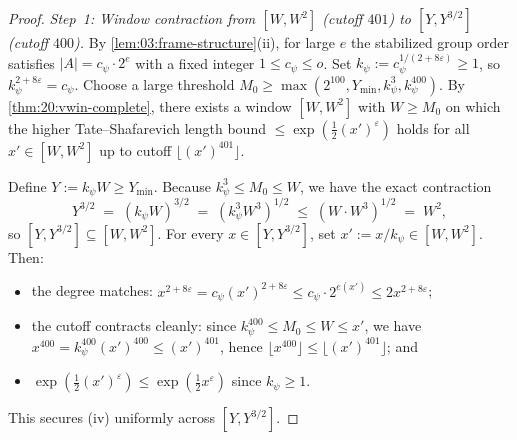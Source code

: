 \begin{proof}
\emph{Step~1: Window contraction from $[W, W^2]$ (cutoff $401$) to $[Y, Y^{3/2}]$ (cutoff $400$).}
By \cref{lem:03:frame-structure}(ii), for large $e$ the stabilized group order satisfies $|A| = c_\psi \cdot 2^e$ with a fixed integer $1 \le c_\psi \le o$. Set $k_\psi := c_\psi^{1/(2+8\varepsilon)} \ge 1$, so $k_\psi^{2+8\varepsilon} = c_\psi$. Choose a large threshold $M_0 \ge \max(2^{100}, Y_{\min}, k_\psi^3, k_\psi^{400})$. By \cref{thm:20:vwin-complete}, there exists a window $[W, W^2]$ with $W \ge M_0$ on which the higher Tate--Shafarevich length bound $\le \exp(\frac{1}{2} (x')^\varepsilon)$ holds for all $x' \in [W, W^2]$ up to cutoff $\lfloor (x')^{401}\rfloor$.

Define $Y := k_\psi W \ge Y_{\min}$. Because $k_\psi^3 \le M_0 \le W$, we have the exact contraction
\[
  Y^{3/2} \;=\; (k_\psi W)^{3/2} \;=\; (k_\psi^3 W^3)^{1/2} \;\le\; (W \cdot W^3)^{1/2} \;=\; W^2,
\]
so $[Y, Y^{3/2}] \subseteq [W, W^2]$. For every $x \in [Y, Y^{3/2}]$, set $x' := x / k_\psi \in [W, W^2]$. Then:
\begin{itemize}
\item the degree matches: $x^{2+8\varepsilon} = c_\psi (x')^{2+8\varepsilon} \le c_\psi \cdot 2^{e(x')} \le 2 x^{2+8\varepsilon}$;
\item the cutoff contracts cleanly: since $k_\psi^{400} \le M_0 \le W \le x'$, we have $x^{400} = k_\psi^{400} (x')^{400} \le (x')^{401}$, hence $\lfloor x^{400} \rfloor \le \lfloor (x')^{401}\rfloor$; and
\item $\exp(\frac{1}{2}(x')^\varepsilon) \le \exp(\frac{1}{2}x^\varepsilon)$ since $k_\psi \ge 1$.
\end{itemize}
This secures (iv) uniformly across $[Y, Y^{3/2}]$.


\end{proof}
